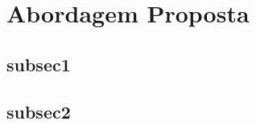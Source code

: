 \chapter{Abordagem Proposta} \label{chap:propApproach}
	\begin{myenv}{1.5}
		
		\section{subsec1}
		\section{subsec2}
		
	\end{myenv}